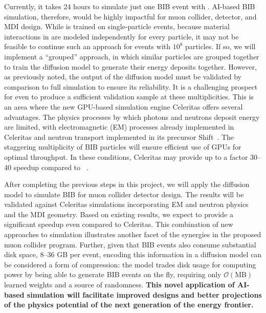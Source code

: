 Currently, it takes 24 hours to simulate just one BIB event with \GEANTfour.
AI-based BIB simulation, therefore, would be highly impactful for muon collider, detector, and MDI design.
While \diffu is trained on single-particle events, because material interactions in \GEANTfour are modeled independently for every particle,
it may not be feasible to continue such an approach for events with $10^8$ particles.
If so, we will implement a ``grouped'' approach, in which similar particles are grouped together to train the diffusion model to generate their energy deposits together.
However, as previously noted, the output of the diffusion model must be validated by comparison to full simulation to ensure its reliability.
It is a challenging prospect for \GEANTfour even to produce a sufficient validation sample at these multiplicities.
This is an area where the new GPU-based simulation engine Celeritas offers several advantages.
The physics processes by which photons and neutrons deposit energy are limited,
with electromagnetic (EM) processes already implemented in Celeritas and neutron transport implemented in its precursor Shift~\cite{Hamilton:2018}.
The staggering multiplicity of BIB particles will ensure efficient use of GPUs for optimal throughput.
In these conditions, Celeritas may provide up to a factor 30--40 speedup compared to \GEANTfour~\cite{Tognini:2022nmd}.

After completing the previous steps in this project,
we will apply the diffusion model to simulate BIB for muon collider detector design.
The results will be validated against Celeritas simulations incorporating EM and neutron physics and the MDI geometry.
Based on existing results, we expect \diffu to provide a significant speedup even compared to Celeritas.
This combination of new approaches to simulation illustrates another facet of the synergies in the proposed muon collider program.
Further, given that BIB events also consume substantial disk space, 8--36 GB per event,
encoding this information in a diffusion model can be considered a form of compression:
the model trades disk usage for computing power by being able to generate BIB events on the fly,
requiring only $\mathcal{O}(\text{MB})$ learned weights and a source of randomness.
\textbf{This novel application of AI-based simulation will facilitate improved designs and
better projections of the physics potential of the next generation of the energy frontier.}

